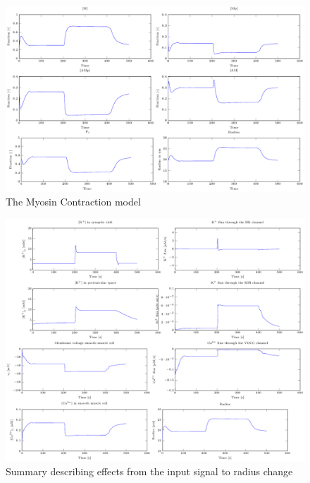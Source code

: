 \begin{landscape}
		\begin{figure}[h!]
			\centering
			\tiny 
			\setlength\figureheight{3 cm} 
			\setlength\figurewidth{9 cm}
			\includegraphics{figures/5_MC_model.pdf}
			\caption{The Myosin Contraction model}
			\label{fig:5MCm}
		\end{figure}
		
		\begin{figure}[h!]
			\centering
			\tiny 
			\setlength\figureheight{3 cm} 
			\setlength\figurewidth{9 cm}
			\includegraphics[height = \textwidth]{figures/6_Neuron_to_Radius.pdf}
			\caption{Summary describing effects from the input signal to radius change}
			\label{fig:6NtR}
		\end{figure}
		
	\end{landscape}
	
